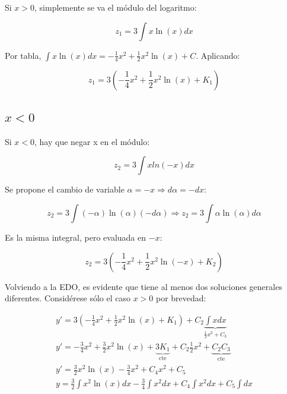 \documentclass{article}
\begin{document}
Si $x > 0$, simplemente se va el módulo del logaritmo:

\begin{equation}
z_1 = 3 \int x \ln(x) dx
\end{equation}

Por tabla, $\int x \ln(x) dx = -\frac{1}{4} x^2 + \frac{1}{2} x^2 \ln(x) + C$. Aplicando:

\begin{equation}
z_1 = 3  \left( -\frac{1}{4} x^2 + \frac{1}{2} x^2 \ln (x) + K_1 \right)
\end{equation}

\subsection{\texorpdfstring{$x < 0$}{x < 0}}

Si $x < 0$, hay que negar x en el módulo:

\begin{equation}
z_2 = 3 \int x ln(-x) dx 
\end{equation}

Se propone el cambio de variable $\alpha = -x \Rightarrow d\alpha = -dx$:

\begin{equation}
z_2 = 3 \int (-\alpha) \ln(\alpha) (-d\alpha) \Rightarrow z_2 = 3 \int \alpha \ln(\alpha) d\alpha
\end{equation}

Es la misma integral, pero evaluada en $-x$:

\begin{equation}
z_2 = 3 \left( -\frac{1}{4} x^2 + \frac{1}{2} x^2 \ln(-x) + K_2 \right)
\end{equation}

Volviendo a la EDO, es evidente que tiene al menos dos soluciones generales diferentes. Considérese sólo el caso $x>0$ por brevedad:

\begin{gather}
y' = 3 \left( -\frac{1}{4} x^2 + \frac{1}{2} x^2 \ln (x) + K_1 \right) + C_2 \underbrace{\int x dx}_{\frac{1}{2} x^2 + C_3} \\
y' = -\frac{3}{4} x^2 + \frac{3}{2} x^2 \ln(x) + \underbrace{3 K_1}_{\text{cte}} + C_2 \frac{1}{2} x^2 + \underbrace{C_2 C_3}_{\text{cte}} \\
y' = \frac{3}{2} x^2 \ln(x) - \frac{3}{4} x^2 + C_4 x^2 + C_5 \\
y = \frac{3}{2} \int x^2 \ln(x) dx -\frac{3}{4} \int x^2 dx + C_4 \int x^2 dx + C_5 \int dx 
\end{gather}
\end{document}
